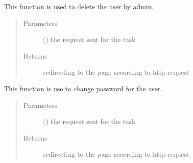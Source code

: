\documentclass[letterpaper,10pt,english]{sphinxmanual}
\begin{document}
\begin{fulllineitems}
\label{\detokenize{janta:janta.views.admin_del_user}}
This function is used to delete the user by admin.
\begin{quote}\begin{description}
\item[{Parameters}] \leavevmode
{} () \textendash{} the request sent for the task

\item[{Returns}] \leavevmode
redirecting to the page according to http request

\end{description}\end{quote}

\end{fulllineitems}


\begin{fulllineitems}
\label{\detokenize{janta:janta.views.change_password}}
This function is use to change password for the user.
\begin{quote}\begin{description}
\item[{Parameters}] \leavevmode
{} () \textendash{} the request sent for the task

\item[{Returns}] \leavevmode
redirecting to the page according to http request

\end{description}\end{quote}

\end{fulllineitems}

\end{document}
